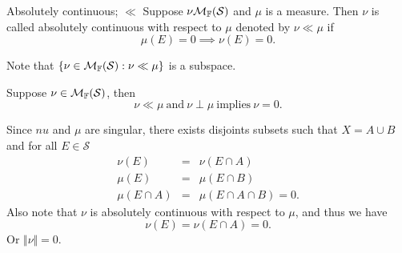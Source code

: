 \begin{sdefinition}{Absolutely continuous; $\ll$}{}
Suppose $\nu \mathcal{M}_{\mathbb{F}}(\mathcal S)$ and $\mu$ is a measure. Then $\nu$ is called absolutely continuous with respect to $\mu$ denoted by $\nu \ll \mu$ if 
$$
\mu(E)=0 \implies \nu(E)=0. 
$$
\end{sdefinition}
Note that $\{\nu \in \mathcal{M}_{\mathbb{F}}(\mathcal S): \nu \ll \mu\}$ is a subspace.

\begin{stheorem}{}{}
Suppose $\nu \in \mathcal{M}_{\mathbb{F}}(\mathcal S)$, then
$$
\nu \ll \mu \ \text{and} \ \nu \perp \mu \ \text{implies} \ \nu=0. 
$$	
\end{stheorem}
\begin{Proof}
Since $nu$ and $\mu$ are singular, there exists disjoints subsets such that $X=A\cup B$ and for all $E\in \mathcal S$ 
\begin{eqnarray*}
	\nu(E) &=& \nu(E\cap A) \\
	\mu(E) &=& \mu(E\cap B) \\
	\mu(E\cap A) &=& \mu(E\cap A \cap B) = 0.
\end{eqnarray*}
Also note that $\nu$ is absolutely continuous with respect to $\mu$, and thus we have
$$
\nu(E) = \nu(E \cap A) =0.
$$
Or $\Vert \nu \Vert=0$.
\end{Proof}









